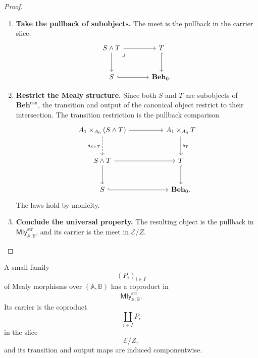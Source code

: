 \begin{proof}
    \leavevmode
    \begin{enumerate}
        \item \textbf{Take the pullback of subobjects.}
        The meet is the pullback in the carrier slice:
        \[
        \begin{tikzcd}[column sep=large, row sep=large]
            S\wedge T
                \arrow[r]
                \arrow[d]
                \arrow[dr, phantom, "\lrcorner", very near start]
            &
            T
                \arrow[d, hook]
            \\
            S
                \arrow[r, hook]
            &
            \mathbf{Beh}_0 .
        \end{tikzcd}
        \]

        \item \textbf{Restrict the Mealy structure.}
        Since both \(S\) and \(T\) are subobjects of
        \(\mathbf{Beh}^{\mathrm{can}}\), the transition and output of the
        canonical object restrict to their intersection. The transition
        restriction is the pullback comparison
        \[
        \begin{tikzcd}[column sep=huge, row sep=large]
            A_1\times_{A_0}(S\wedge T)
                \arrow[r]
                \arrow[d, dashed, "\delta_{S\wedge T}"']
            &
            A_1\times_{A_0}T
                \arrow[d, "\delta_T"]
            \\
            S\wedge T
                \arrow[r]
                \arrow[d]
            &
            T
                \arrow[d, hook]
            \\
            S
                \arrow[r, hook]
            &
            \mathbf{Beh}_0 .
        \end{tikzcd}
        \]
        The laws hold by monicity.

        \item \textbf{Conclude the universal property.}
        The resulting object is the pullback in
        \(\mathsf{Mly}^{\mathrm{str}}_{\mathbb A,\mathbb B}\), and its carrier
        is the meet in \(\mathcal E/Z\).
    \end{enumerate}
\end{proof}

\begin{proposition}
\label{prop:small-coproducts-mealy}
    A small family
    \[
        (P_i)_{i\in I}
    \]
    of Mealy morphisms over \((\mathbb A,\mathbb B)\) has a coproduct in
    \[
        \mathsf{Mly}^{\mathrm{str}}_{\mathbb A,\mathbb B}.
    \]
    Its carrier is the coproduct
    \[
        \coprod_{i\in I}P_i
    \]
    in the slice
    \[
        \mathcal E/Z,
    \]
    and its transition and output maps are induced componentwise.
\end{proposition}

